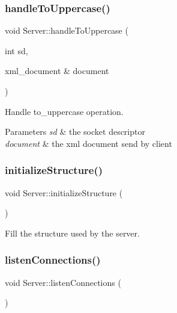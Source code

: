 \subsubsection{\texorpdfstring{handle\+To\+Uppercase()}{handleToUppercase()}}
{\footnotesize\ttfamily void Server\+::handle\+To\+Uppercase (\begin{DoxyParamCaption}\item[{int}]{sd,  }\item[{xml\+\_\+document \&}]{document }\end{DoxyParamCaption})\hspace{0.3cm}{\ttfamily [private]}}

Handle to\+\_\+uppercase operation. 
\begin{DoxyParams}{Parameters}
{\em sd} & the socket descriptor \\
\hline
{\em document} & the xml document send by client \\
\hline
\end{DoxyParams}
\mbox{\label{classServer_abeb8bfed07ed024654d2ca797d99df01}} 
\subsubsection{\texorpdfstring{initialize\+Structure()}{initializeStructure()}}
{\footnotesize\ttfamily void Server\+::initialize\+Structure (\begin{DoxyParamCaption}{ }\end{DoxyParamCaption})\hspace{0.3cm}{\ttfamily [private]}}

Fill the structure used by the server. \mbox{\label{classServer_adf63a3e3f481ef8492642ea8746c471b}} 
\subsubsection{\texorpdfstring{listen\+Connections()}{listenConnections()}}
{\footnotesize\ttfamily void Server\+::listen\+Connections (\begin{DoxyParamCaption}{ }\end{DoxyParamCaption})\hspace{0.3cm}{\ttfamily [private]}}

